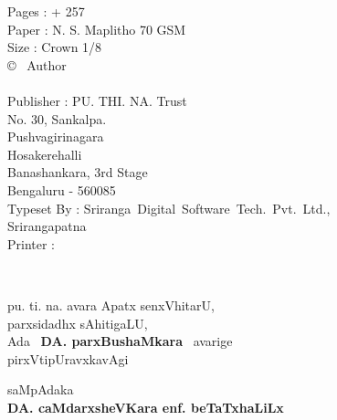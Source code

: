\noindent
{\rm 
Pages :  + 257\\[3pt]
Paper : N. S. Maplitho 70 GSM\\
Size : Crown 1/8\\[3pt]
\copyright~ Author\\[30pt]
\rupee \\[30pt]
Publisher : PU. THI. NA. Trust\\
No. 30, Sankalpa.\\
Pushvagirinagara\\
Hosakerehalli\\
Banashankara, 3rd Stage\\
Bengaluru - 560085\\[15pt]
Typeset By : \hbox{Sriranga Digital Software Tech. Pvt. Ltd.,}\\
Srirangapatna\\[15pt]
Printer :}

\newpage

\thispagestyle{empty}
~\phantom{a}

\vfill

\begin{minipage}[c]{8cm}
\begin{center}
pu. ti. na. avara Apatx senxVhitarU,\\[3pt]
parxsidadhx sAhitigaLU,\\[3pt]
Ada~ {\large\bf DA. parxBushaMkara}~ avarige\\[3pt]
pirxVtipUravxkavAgi
\end{center}

\bigskip

\begin{flushright}
saMpAdaka\hspace{1.2cm}\,\\[3pt]
{\bf DA. caMdarxsheVKara enf. beTaTxhaLiLx}
\end{flushright}
\end{minipage}

\vfill\eject

\thispagestyle{empty}
~\phantom{a}

